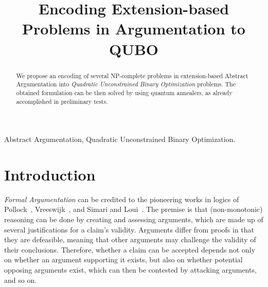 \documentclass[conference]{IEEEtran}
\begin{document}
\title{Encoding Extension-based Problems in Argumentation to QUBO}

\author{
\and
{}
}

\maketitle

\begin{abstract}
We propose an encoding of several NP-complete problems in extension-based Abstract Argumentation into \emph{Quadratic Unconstrained Binary Optimization} problems. The obtained formulation can be then solved by using quantum annealers, as already accomplished in preliminary tests.
\end{abstract}

\begin{IEEEkeywords}
Abstract Argumentation, Quadratic Unconstrained Binary Optimization.
\end{IEEEkeywords}

\section{Introduction}\label{sect:intro}
\emph{Formal Argumentation} can be credited to the pioneering works in logics of Pollock~\cite{pollock92}, Vreeswijk~\cite{vreeswijk92}, and Simari and Loui~\cite{simari92}. The premise is that (non-monotonic) reasoning can be done by creating and assessing arguments, which are made up of several justifications for a claim's validity. Arguments differ from proofs in that they are defeasible, meaning that other arguments may challenge the validity of their conclusions. Therefore, whether a claim can be accepted depends not only on whether an argument supporting it exists, but also on whether potential opposing arguments exist, which can then be contested by attacking arguments, and so on.
\end{document}
